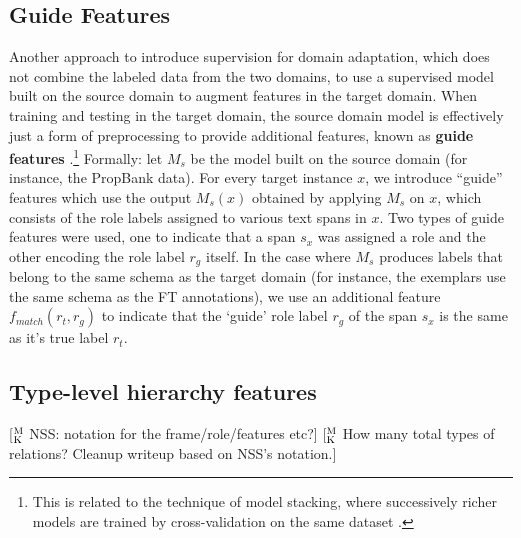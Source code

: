 \documentclass[11pt,a4paper]{article}
\newcommand{\ensuretext}[1]{#1}
\newcommand{\mkmarker}{\ensuretext{\textcolor{mdgreen}{\ensuremath{^{\textsc{M}}_{\textsc{K}}}}}}
\newcommand{\arkcomment}[3]{\ensuretext{\textcolor{#3}{[#1 #2]}}}
\newcommand{\mk}[1]{\arkcomment{\mkmarker}{#1}{mdgreen}}
\begin{document}
\subsection{Guide Features}
Another approach to introduce supervision for domain adaptation, 
which does not combine the labeled data from the two domains, 
to use a supervised model built on the source domain to augment features in the target domain.
When training and testing in the target domain, 
the source domain model is effectively just a form of preprocessing to provide 
additional features, known as \textbf{guide features} \citep{johansson-13,kong-14}.\footnote{This is related to the technique
of model stacking, where successively richer models are trained by cross-validation on the same dataset 
\citet[e.g.,][]{cohen-05,nivre-08,martins-08}.}
Formally: let $M_{s}$ be the model built on
the source domain (for instance, the PropBank data). 
For every target instance $x$, we introduce ``guide'' features which use the output $M_s(x)$
obtained by applying $M_s$ on $x$, which consists of the role labels assigned to various text spans in $x$. 
Two types of guide features were used,
one to indicate that a span $s_x$ was assigned a role and the other encoding the role label $r_g$ itself. 
In the case where $M_s$ produces labels
that belong to the same schema as the target domain 
(for instance, the exemplars use the same schema as the FT annotations), 
we use an additional feature $f_{match}(r_t,r_g)$ to indicate that 
the `guide' role label $r_g$ of the span $s_x$ is the same as it's true label $r_t$.


\subsection{Type-level hierarchy features}
\mk{NSS: notation for the frame/role/features etc?}
\mk{How many total types of relations? Cleanup writeup based on NSS's notation.}
\end{document}
